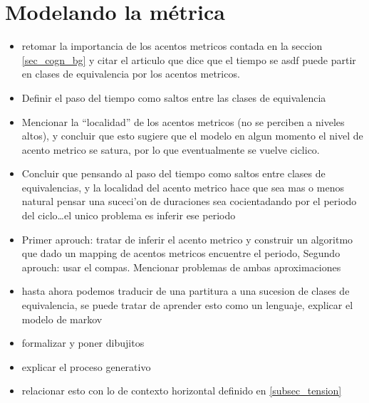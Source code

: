 \section{Modelando la m\'etrica}
\begin{itemize}
 \item retomar la importancia de los acentos metricos contada en la seccion \ref{sec_cogn_bg} y citar el articulo que dice que el tiempo se 
 asdf \cite{lerjackGTTM}
 puede partir en clases de equivalencia por los acentos metricos. 

 \item Definir el paso del tiempo como saltos entre las clases de equivalencia

 \item Mencionar la ``localidad'' de los acentos metricos (no se perciben a niveles altos), y concluir que esto sugiere que el modelo en algun momento
 el nivel de acento metrico se satura, por lo que eventualmente se vuelve ciclico.

 \item Concluir que pensando al paso del tiempo como saltos entre clases de equivalencias, y la localidad del acento metrico hace que sea
 mas o menos natural pensar una suceci'on de duraciones sea cocientadando por el periodo del ciclo\ldots el unico problema es inferir ese periodo

 \item Primer aprouch: tratar de inferir el acento metrico y construir un algoritmo que dado un mapping de acentos metricos encuentre el periodo,
       Segundo aprouch: usar el compas.
       Mencionar problemas de ambas aproximaciones

 \item hasta ahora podemos traducir de una partitura a una sucesion de clases de equivalencia, se puede tratar de aprender esto como un lenguaje,
 explicar el modelo de markov

 \item formalizar y poner dibujitos

 \item explicar el proceso generativo

 \item relacionar esto con lo de contexto horizontal definido en \ref{subsec_tension}

\end{itemize}

